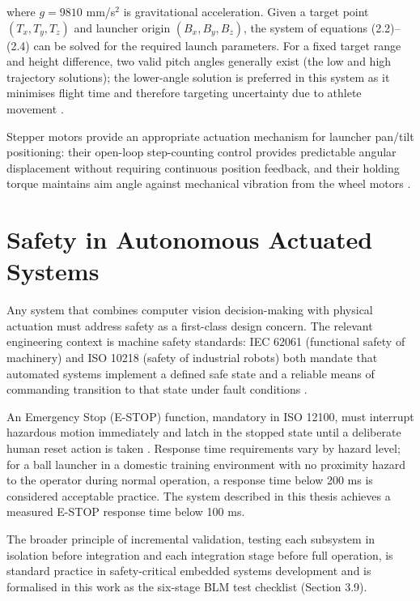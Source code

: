 where $g = 9810$ mm/s$^2$ is gravitational acceleration. Given a target point $(T_x, T_y, T_z)$ and launcher origin $(B_x, B_y, B_z)$, the system of equations (2.2)--(2.4) can be solved for the required launch parameters. For a fixed target range and height difference, two valid pitch angles generally exist (the low and high trajectory solutions); the lower-angle solution is preferred in this system as it minimises flight time and therefore targeting uncertainty due to athlete movement \cite{ref19}.

Stepper motors provide an appropriate actuation mechanism for launcher pan/tilt positioning: their open-loop step-counting control provides predictable angular displacement without requiring continuous position feedback, and their holding torque maintains aim angle against mechanical vibration from the wheel motors \cite{ref20}.

\section{Safety in Autonomous Actuated Systems}

Any system that combines computer vision decision-making with physical actuation must address safety as a first-class design concern. The relevant engineering context is machine safety standards: IEC 62061 (functional safety of machinery) \cite{ref21} and ISO 10218 (safety of industrial robots) \cite{ref26} both mandate that automated systems implement a defined safe state and a reliable means of commanding transition to that state under fault conditions \cite{ref21}.

An Emergency Stop (E-STOP) function, mandatory in ISO 12100, must interrupt hazardous motion immediately and latch in the stopped state until a deliberate human reset action is taken \cite{ref22}. Response time requirements vary by hazard level; for a ball launcher in a domestic training environment with no proximity hazard to the operator during normal operation, a response time below 200 ms is considered acceptable practice. The system described in this thesis achieves a measured E-STOP response time below 100 ms.

The broader principle of incremental validation, testing each subsystem in isolation before integration and each integration stage before full operation, is standard practice in safety-critical embedded systems development \cite{ref23} and is formalised in this work as the six-stage BLM test checklist (Section 3.9).

